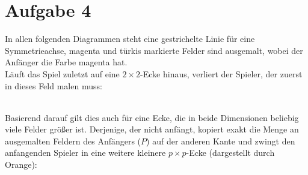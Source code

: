\documentclass[12pt,a4paper,oneside]{article}
\begin{document}
\pagebreak
\section[]{Aufgabe 4}

In allen folgenden Diagrammen steht eine gestrichelte Linie für eine Symmetrieachse, magenta und türkis markierte Felder sind ausgemalt, wobei der Anfänger die Farbe magenta hat.
\\[10pt]
Läuft das Spiel zuletzt auf eine $2\times2$-Ecke hinaus, verliert der Spieler, der zuerst in dieses Feld malen muss: \\
\\
Basierend darauf gilt dies auch für eine Ecke, die in beide Dimensionen beliebig viele Felder größer ist. Derjenige, der nicht anfängt, kopiert exakt die Menge an ausgemalten Feldern des Anfängers ($P$) auf der anderen Kante und zwingt den anfangenden Spieler in eine weitere kleinere $p\times p$-Ecke (dargestellt durch Orange):
\\
\end{document}
